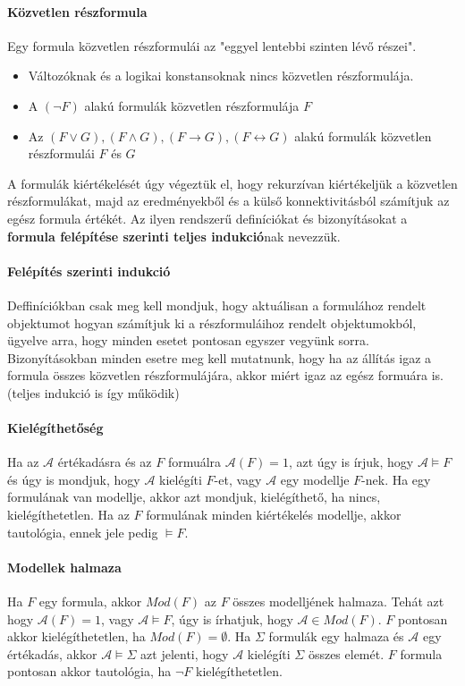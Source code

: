\documentclass[10pt,a4paper]{article}
\begin{document}
\paragraph{Közvetlen részformula}
Egy formula közvetlen részformulái az "eggyel lentebbi szinten lévő részei". 
\begin{itemize}
\item Változóknak és a logikai konstansoknak nincs közvetlen részformulája.
\item A $(\neg F)$ alakú formulák közvetlen részformulája $F$
\item Az $(F \vee G), (F \wedge G), (F \rightarrow G), (F \leftrightarrow G)$ alakú formulák közvetlen részformulái  $F$ és $G$
\end{itemize}
A formulák kiértékelését úgy végeztük el, hogy rekurzívan kiértékeljük a közvetlen részformulákat, majd az eredményekből és a külső konnektivitásból számítjuk az egész formula értékét. Az ilyen rendszerű definíciókat és bizonyításokat a \textbf{formula felépítése szerinti teljes indukció}nak nevezzük.
\paragraph{Felépítés szerinti indukció}
Deffiníciókban csak meg kell mondjuk, hogy aktuálisan a formulához rendelt objektumot hogyan számítjuk ki a részformuláihoz rendelt objektumokból, ügyelve arra, hogy minden esetet pontosan egyszer vegyünk sorra. \newline
Bizonyításokban minden esetre meg kell mutatnunk, hogy ha az állítás igaz a formula összes közvetlen részformulájára, akkor miért igaz az egész formuára is. (teljes indukció is így működik)
\paragraph{Kielégíthetőség}
Ha az $\mathcal{A}$ értékadásra és az $F$ formuálra $\mathcal{A}(F)=1$, azt úgy is írjuk, hogy $\mathcal{A}\models F$ és úgy is mondjuk, hogy $\mathcal{A}$ kielégíti $F$-et, vagy $\mathcal{A}$ egy modellje $F$-nek. Ha egy formulának van modellje, akkor azt mondjuk, kielégíthető, ha nincs, kielégíthetetlen. Ha az $F$ formulának minden kiértékelés modellje, akkor tautológia, ennek jele pedig $\models F$.
\paragraph{Modellek halmaza}
Ha $F$ egy formula, akkor $Mod(F)$ az $F$ összes modelljének halmaza. Tehát azt hogy $\mathcal{A}(F)=1$, vagy $\mathcal{A} \models F$, úgy is írhatjuk, hogy $\mathcal{A}\in Mod(F)$. $F$ pontosan akkor kielégíthetetlen, ha $Mod(F)=\emptyset$. Ha $\Sigma$ formulák egy halmaza és $\mathcal{A}$ egy értékadás, akkor $\mathcal{A} \models \Sigma$ azt jelenti, hogy $\mathcal{A}$ kielégíti $\Sigma$ összes elemét. $F$ formula pontosan akkor tautológia, ha $\neg F$ kielégíthetetlen.
\end{document}
